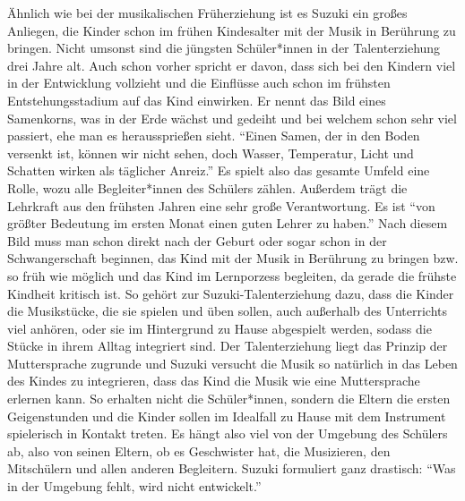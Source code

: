 Ähnlich wie bei der musikalischen Früherziehung ist es Suzuki ein großes
Anliegen, die Kinder schon im frühen Kindesalter mit der Musik in Berührung zu
bringen. Nicht umsonst sind die jüngsten Schüler*innen in der Talenterziehung
drei Jahre alt. Auch schon vorher spricht er davon, dass sich bei den Kindern
viel in der Entwicklung vollzieht und die Einflüsse auch schon im frühsten
Entstehungsstadium auf das Kind einwirken. Er nennt das Bild eines Samenkorns,
was in der Erde wächst und gedeiht und bei welchem schon sehr viel passiert, ehe
man es heraussprießen sieht. \enquote{Einen Samen, der in den Boden versenkt
ist, können wir nicht sehen, doch Wasser, Temperatur, Licht und Schatten wirken
als täglicher Anreiz.}\autocite[17]{suzuki:erziehung_ist_liebe} Es spielt also
das gesamte Umfeld eine Rolle, wozu alle Begleiter*innen des Schülers zählen.
Außerdem trägt die Lehrkraft aus den frühsten Jahren eine sehr große
Verantwortung. Es ist
\enquote{von größter Bedeutung im ersten Monat einen guten Lehrer zu haben.}
\autocite[21]{suzuki:erziehung_ist_liebe} Nach diesem Bild muss man schon direkt
nach der Geburt oder sogar schon in der Schwangerschaft beginnen, das Kind mit
der Musik in Berührung zu bringen bzw. so früh wie möglich und das Kind im
Lernporzess begleiten, da gerade die frühste Kindheit kritisch ist.
\autocite[25]{suzuki:erziehung_ist_liebe} So gehört zur Suzuki-Talenterziehung
dazu, dass die Kinder die Musikstücke, die sie spielen und üben sollen, auch
außerhalb des Unterrichts viel anhören, oder sie im Hintergrund zu Hause
abgespielt werden, sodass die Stücke in ihrem Alltag integriert sind. Der
Talenterziehung liegt das Prinzip der Muttersprache zugrunde und Suzuki versucht
die Musik so natürlich in das Leben des Kindes zu integrieren, dass das Kind die
Musik wie eine Muttersprache erlernen kann.  So erhalten nicht die
Schüler*innen, sondern die Eltern die ersten Geigenstunden und die Kinder sollen
im Idealfall zu Hause mit dem Instrument spielerisch in Kontakt treten.
\autocite[75]{suzuki:erziehung_ist_liebe} Es hängt also viel von der Umgebung
des Schülers ab, also von seinen Eltern, ob es Geschwister hat, die Musizieren,
den Mitschülern und allen anderen Begleitern. Suzuki formuliert ganz drastisch:
\enquote{Was in der Umgebung fehlt, wird nicht entwickelt.}
\autocite[25]{suzuki:erziehung_ist_liebe}

